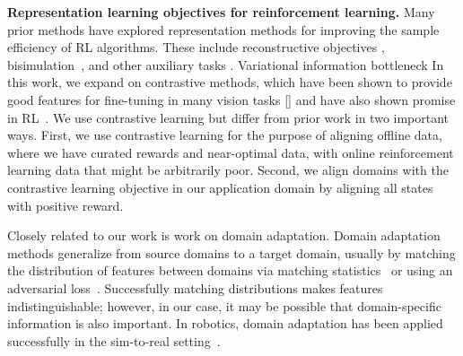 \documentclass[letterpaper, 10 pt, conference, final]{ieeeconf}   %
\begin{document}
\textbf{Representation learning objectives for reinforcement learning.}
Many prior methods have explored representation methods for improving the sample efficiency of RL algorithms. These include reconstructive objectives \cite{lange2010deep, lange2012autonomous, finn2016deep}, bisimulation~\cite{ferns2004bisimulation, castro20bisimulation, zhang2021dbc}, and other auxiliary tasks \cite{jonschkowski2017pve, ghosh2018learning, sax2018midlevel}. 
Variational information bottleneck 
In this work, we expand on contrastive methods, which have been shown to provide good features for fine-tuning in many vision tasks [] and have also shown promise in RL~\cite{laskin2020curl}. 
We use contrastive learning but differ from prior work in two important ways.
First, we use contrastive learning for the purpose of aligning offline data, where we have curated rewards and near-optimal data, with online reinforcement learning data that might be arbitrarily poor.
Second, we align domains with the contrastive learning objective in our application domain by aligning all states with positive reward.

Closely related to our work is work on domain adaptation. Domain adaptation methods generalize from source domains to a target domain, usually by matching the distribution of features between domains via matching statistics~\cite{tzeng2014domainconfusion, sun2016coral, long2015adaptation} or using an adversarial loss~\cite{ganin2016domainadversarial, Bousmalis2016}.
Successfully matching distributions makes features indistinguishable; however, in our case, it may be possible that domain-specific information is also important.
In robotics, domain adaptation has been applied successfully in the sim-to-real setting~\cite{bousmalis2017simtoreal, james218simtosim}.
\end{document}
